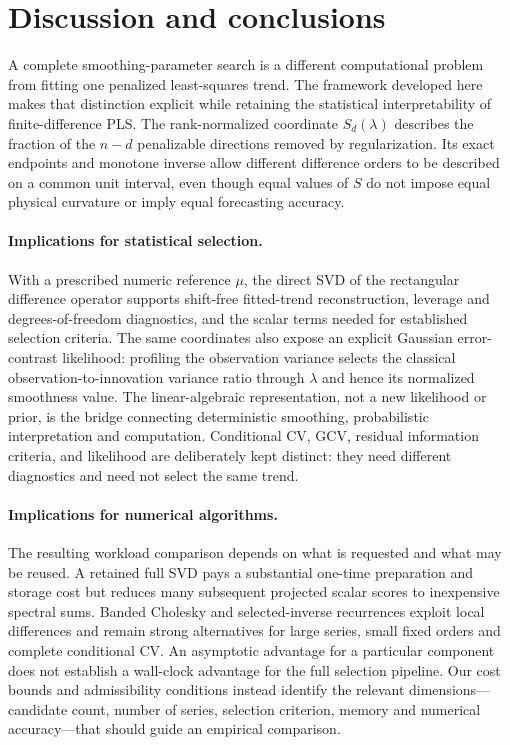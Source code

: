\section{Discussion and conclusions}\label{sec:conclusion}

A complete smoothing-parameter search is a different
computational problem from fitting one penalized
least-squares trend.  The framework developed here
makes that distinction explicit while retaining the
statistical interpretability of finite-difference PLS.
The rank-normalized coordinate $S_d(\lambda)$ describes
the fraction of the $n-d$ penalizable directions removed
by regularization.  Its exact endpoints and monotone
inverse allow different difference orders to be described
on a common unit interval, even though equal values of
$S$ do not impose equal physical curvature or imply
equal forecasting accuracy.

\paragraph{Implications for statistical selection.}
With a prescribed numeric reference $\mu$, the direct SVD
of the rectangular difference operator supports
shift-free fitted-trend reconstruction, leverage and
degrees-of-freedom diagnostics, and the scalar terms
needed for established selection criteria.
The same coordinates also expose an explicit Gaussian
error-contrast likelihood: profiling the observation
variance selects the classical observation-to-innovation
variance ratio through $\lambda$ and hence its
normalized smoothness value.  The linear-algebraic
representation, not a new likelihood or prior, is the
bridge connecting deterministic smoothing,
probabilistic interpretation and computation.
Conditional CV, GCV, residual information criteria,
and likelihood are deliberately kept distinct:
they need different diagnostics and need not select
the same trend.

\paragraph{Implications for numerical algorithms.}
The resulting workload comparison depends on what is
requested and what may be reused.  A retained full SVD
pays a substantial one-time preparation and storage cost
but reduces many subsequent projected scalar scores to
inexpensive spectral sums.  Banded Cholesky and
selected-inverse recurrences exploit local differences
and remain strong alternatives for large series,
small fixed orders and complete conditional CV.
An asymptotic advantage for a particular component
does not establish a wall-clock advantage for the
full selection pipeline.  Our cost bounds and
admissibility conditions instead identify the
relevant dimensions---candidate count, number of
series, selection criterion, memory and numerical
accuracy---that should guide an empirical comparison.

